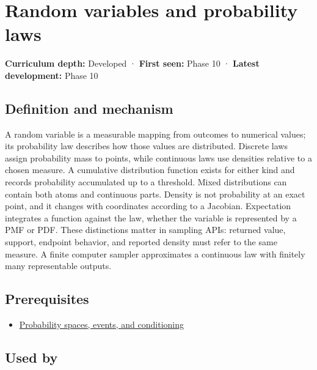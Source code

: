 \hypertarget{appendix-4d0203f7944f}{}\label{referencestart:appendix-4d0203f7944f}
\section{Random variables and probability laws}\label{appendix-4d0203f7944f-random-variables-and-probability-laws}

\textbf{Curriculum depth:} Developed · \textbf{First seen:} Phase 10 · \textbf{Latest development:} Phase 10

\subsection{Definition and mechanism}\label{appendix-4d0203f7944f-definition-and-mechanism}

A random variable is a measurable mapping from outcomes to numerical values; its probability law describes how those values are distributed. Discrete laws assign probability mass to points, while continuous laws use densities relative to a chosen measure. A cumulative distribution function exists for either kind and records probability accumulated up to a threshold. Mixed distributions can contain both atoms and continuous parts. Density is not probability at an exact point, and it changes with coordinates according to a Jacobian. Expectation integrates a function against the law, whether the variable is represented by a PMF or PDF. These distinctions matter in sampling APIs: returned value, support, endpoint behavior, and reported density must refer to the same measure. A finite computer sampler approximates a continuous law with finitely many representable outputs.

\subsection{Prerequisites}\label{appendix-4d0203f7944f-prerequisites}

\begin{itemize}
\tightlist
\item
  \hyperref[appendix-f1ef323f6ed7]{Probability spaces, events, and conditioning}
\end{itemize}

\subsection{Used by}\label{appendix-4d0203f7944f-used-by}

